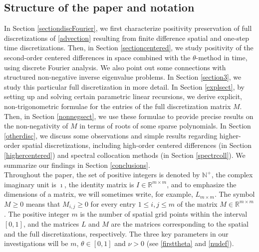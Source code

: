 \documentclass[a4paper]{article}
\newcommand{\nplus}{\mathbb{N}^+}
\newcommand{\rr}{\mathbb{R}}
\begin{document}

\subsection{Structure of the paper and notation}
In Section \ref{sectiondiscFourier}, we first characterize 
positivity preservation of full discretizations of \eqref{advection} resulting from 
finite difference spatial and one-step time discretizations. Then, in Section \ref{sectioncentered}, we study positivity of the second-order centered differences in space 
combined with the $\theta$-method in
time, using discrete Fourier
analysis. We also point out some connections with structured non-negative inverse eigenvalue problems. In Section \ref{section3}, we study this particular full discretization in more detail. 
In Section \ref{explsect}, by setting up and solving certain parametric linear recursions, we derive explicit, non-trigonometric formulae for the entries of the full discretization matrix $M$. Then, in Section \ref{nonnegsect}, we use these formulae to provide precise results on the non-negativity of $M$ in terms of roots of some  sparse polynomials.
In Section \ref{otherdisc}, we discuss some observations and simple results regarding
higher-order spatial discretizations, including high-order centered differences
(in Section \ref{highercentered}) and spectral collocation methods (in Section \ref{spectrcoll}).
We summarize our findings in Section \ref{conclusions}.\\


Throughout the paper, the set of positive integers is denoted by $\nplus$, the complex imaginary unit is $\imath$, the identity matrix is $I\in\rr^{m\times m}$, and to emphasize the dimensions of a matrix, we will sometimes write, for example, $L_{m\times m}$.
The symbol $M\ge 0$ means that  $M_{i,j}\ge 0$ for every entry $1\le i, j\le m$ of the matrix $M\in\mathbb{R}^{m\times m}$. The positive integer $m$ is the number of spatial grid points within the interval $[0,1]$, and the matrices $L$ and $M$ are the matrices corresponding to the spatial and the full discretizations, respectively. The three key parameters in our investigations will be $m$, $\theta\in [0,1]$ and $\nu>0$ (see \eqref{firsttheta} and \eqref{nudef}).
\end{document}
